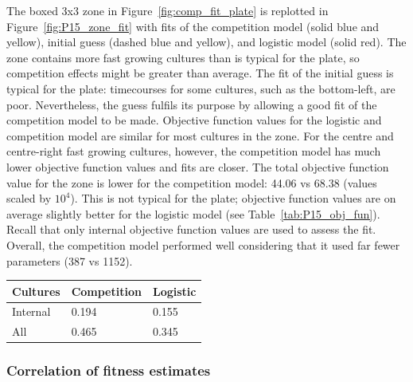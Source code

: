 \begin{multicols}{2}
The boxed 3x3 zone in Figure~\ref{fig:comp_fit_plate} is replotted in
Figure~\ref{fig:P15_zone_fit} with fits of the competition model
(solid blue and yellow), initial guess (dashed blue and yellow), and
logistic model (solid red). The zone contains more fast growing
cultures than is typical for the plate, so competition effects might
be greater than average.
The fit of the initial guess is typical for the plate: timecourses for
some cultures, such as the bottom-left, are poor. Nevertheless, the
guess fulfils its purpose by allowing a good fit of the competition
model to be made. Objective function values for the logistic and
competition model are similar for most cultures in the zone. For the
centre and centre-right fast growing cultures, however, the
competition model has much lower objective function values and fits
are closer. The total objective function value for the zone is lower
for the competition model: 44.06 vs 68.38 (values scaled by
\(10^{4}\)). This is not typical for the plate; objective function
values are on average slightly better for the logistic model (see
Table~\ref{tab:P15_obj_fun}). Recall that only internal objective
function values are used to assess the fit. Overall, the competition
model performed well considering that it used far fewer parameters
(387 vs 1152).
\begin{center}
  \begin{tabular}{l l l}
    \hline
    Cultures     & Competition & Logistic \\
    \hline
    Internal     & 0.194    & 0.155\\
    All          & 0.465    & 0.345\\
    \hline
  \end{tabular}
  \label{tab:P15_obj_fun}
\end{center}

\subsubsection{Correlation of fitness estimates}
\label{sec:correlation}


\end{multicols}
